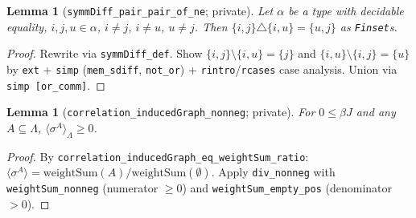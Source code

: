 \documentclass[a4paper,11pt]{article}
\newtheorem{lemma}[theorem]{Lemma}
\begin{document}
\begin{lemma}[\texttt{symmDiff\_pair\_pair\_of\_ne}; private]
  Let $\alpha$ be a type with decidable equality, $i,j,u\in\alpha$, $i\neq j$, $i\neq u$, $u\neq j$.
  Then $\{i,j\}\triangle\{i,u\} = \{u,j\}$ as \texttt{Finset}s.
\end{lemma}
\begin{proof}
  Rewrite via \texttt{symmDiff\_def}.
  Show $\{i,j\}\setminus\{i,u\}=\{j\}$ and $\{i,u\}\setminus\{i,j\}=\{u\}$
  by \texttt{ext} + \texttt{simp} (\texttt{mem\_sdiff}, \texttt{not\_or})
  + \texttt{rintro}/\texttt{rcases} case analysis.
  Union via \texttt{simp [or\_comm]}.
\end{proof}

\begin{lemma}[\texttt{correlation\_inducedGraph\_nonneg}; private]
  For $0\le\beta J$ and any $A\subseteq\Lambda$,
  $\langle\sigma^A\rangle_\Lambda \ge 0$.
\end{lemma}
\begin{proof}
  By \texttt{correlation\_inducedGraph\_eq\_weightSum\_ratio}:
  $\langle\sigma^A\rangle = \mathrm{weightSum}(A)/\mathrm{weightSum}(\emptyset)$.
  Apply \texttt{div\_nonneg} with \texttt{weightSum\_nonneg} (numerator $\ge 0$)
  and \texttt{weightSum\_empty\_pos} (denominator $> 0$).
\end{proof}
\end{document}
